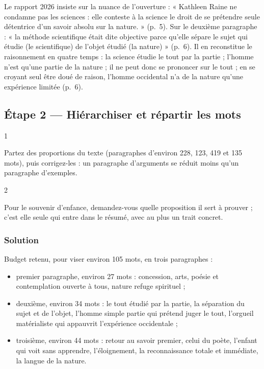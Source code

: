 \documentclass[11pt,a4paper]{article}
\providecommand{\tightlist}{\setlength{\itemsep}{0pt}\setlength{\parskip}{0pt}}
\begin{document}
\begin{jury}

Le rapport 2026 insiste sur la nuance de l'ouverture : « Kathleen Raine ne condamne pas les sciences : elle conteste à la science le droit de se prétendre seule détentrice d'un savoir absolu sur la nature. » (p.~5). Sur le deuxième paragraphe : « la méthode scientifique était dite objective parce qu'elle sépare le sujet qui étudie (le scientifique) de l'objet étudié (la nature) » (p.~6). Il en reconstitue le raisonnement en quatre temps : la science étudie le tout par la partie ; l'homme n'est qu'une partie de la nature ; il ne peut donc se prononcer sur le tout ; en se croyant seul être doué de raison, l'homme occidental n'a de la nature qu'une expérience limitée (p.~6).

\end{jury}

\hypertarget{uxe9tape-2-hiuxe9rarchiser-et-ruxe9partir-les-mots}{%
\subsection{Étape 2 --- Hiérarchiser et répartir les mots}\label{uxe9tape-2-hiuxe9rarchiser-et-ruxe9partir-les-mots}}

\begin{indication}{1}

Partez des proportions du texte (paragraphes d'environ 228, 123, 419 et 135 mots), puis corrigez-les : un paragraphe d'arguments se réduit moins qu'un paragraphe d'exemples.

\end{indication}

\begin{indication}{2}

Pour le souvenir d'enfance, demandez-vous quelle proposition il sert à prouver ; c'est elle seule qui entre dans le résumé, avec au plus un trait concret.

\end{indication}

\hypertarget{solution-1}{%
\subsubsection{Solution}\label{solution-1}}

Budget retenu, pour viser environ 105 mots, en trois paragraphes :

\begin{itemize}
\tightlist
\item
  premier paragraphe, environ 27 mots : concession, arts, poésie et contemplation ouverte à tous, nature refuge spirituel ;
\item
  deuxième, environ 34 mots : le tout étudié par la partie, la séparation du sujet et de l'objet, l'homme simple partie qui prétend juger le tout, l'orgueil matérialiste qui appauvrit l'expérience occidentale ;
\item
  troisième, environ 44 mots : retour au savoir premier, celui du poète, l'enfant qui voit sans apprendre, l'éloignement, la reconnaissance totale et immédiate, la langue de la nature.
\end{itemize}
\end{document}
